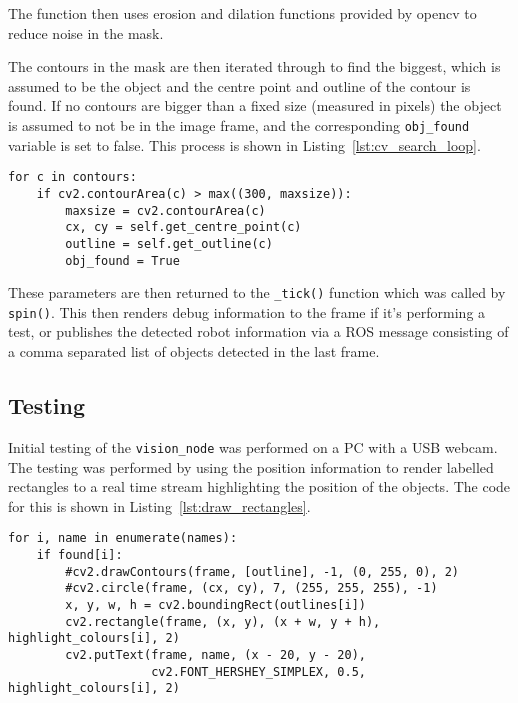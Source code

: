 The function then uses erosion and dilation functions provided by opencv to reduce noise in the
mask.

The contours in the mask are then iterated through to find the biggest, which is assumed to be
the object and the centre point and outline of the contour is found. If no contours are bigger
than a fixed size (measured in pixels) the object is assumed to not be in the image frame, and
the corresponding \verb|obj_found| variable is set to false. This process is shown in Listing~\ref{lst:cv_search_loop}.

\begin{lstlisting}[caption={Contour teration in \texttt{search()}}, label={lst:cv_search_loop}]
for c in contours:
    if cv2.contourArea(c) > max((300, maxsize)):
        maxsize = cv2.contourArea(c)
        cx, cy = self.get_centre_point(c)
        outline = self.get_outline(c)
        obj_found = True
\end{lstlisting}

These parameters are then returned to the \verb|_tick()| function which was called by
\verb|spin()|. This then renders debug information to the frame if it's performing a test, or
publishes the detected robot information via a ROS message consisting of a comma separated list of
objects detected in the last frame.

\subsection{Testing}\label{soft/cv/test}
Initial testing of the \verb|vision_node| was performed on a PC with a USB webcam. The
testing was performed by using the position information to render labelled rectangles to a real
time stream highlighting the position of the objects. The code for this is shown in Listing~\ref{lst:draw_rectangles}.

\begin{lstlisting}[caption={asd}, label={lst:draw_rectangles}]
for i, name in enumerate(names):
    if found[i]:
        #cv2.drawContours(frame, [outline], -1, (0, 255, 0), 2)
        #cv2.circle(frame, (cx, cy), 7, (255, 255, 255), -1)
        x, y, w, h = cv2.boundingRect(outlines[i])
        cv2.rectangle(frame, (x, y), (x + w, y + h), highlight_colours[i], 2)
        cv2.putText(frame, name, (x - 20, y - 20),
                    cv2.FONT_HERSHEY_SIMPLEX, 0.5, highlight_colours[i], 2)
\end{lstlisting}


